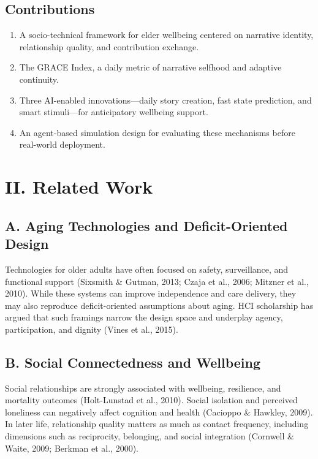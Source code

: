 \documentclass[
  journal,
]{IEEEtran}%
\providecommand{\tightlist}{%
  \setlength{\itemsep}{0pt}\setlength{\parskip}{0pt}}
\begin{document}
\subsection{Contributions}\label{contributions}

\begin{enumerate}
\def\labelenumi{\arabic{enumi}.}
\tightlist
\item
  A socio-technical framework for elder wellbeing centered on narrative
  identity, relationship quality, and contribution exchange.
\item
  The GRACE Index, a daily metric of narrative selfhood and adaptive
  continuity.
\item
  Three AI-enabled innovations---daily story creation, fast state
  prediction, and smart stimuli---for anticipatory wellbeing support.
\item
  An agent-based simulation design for evaluating these mechanisms
  before real-world deployment.
\end{enumerate}

\section{II. Related Work}\label{ii.-related-work}

\subsection{A. Aging Technologies and Deficit-Oriented
Design}\label{a.-aging-technologies-and-deficit-oriented-design}

Technologies for older adults have often focused on safety,
surveillance, and functional support (Sixsmith \& Gutman, 2013; Czaja et
al., 2006; Mitzner et al., 2010). While these systems can improve
independence and care delivery, they may also reproduce deficit-oriented
assumptions about aging. HCI scholarship has argued that such framings
narrow the design space and underplay agency, participation, and dignity
(Vines et al., 2015).

\subsection{B. Social Connectedness and
Wellbeing}\label{b.-social-connectedness-and-wellbeing}

Social relationships are strongly associated with wellbeing, resilience,
and mortality outcomes (Holt-Lunstad et al., 2010). Social isolation and
perceived loneliness can negatively affect cognition and health
(Cacioppo \& Hawkley, 2009). In later life, relationship quality matters
as much as contact frequency, including dimensions such as reciprocity,
belonging, and social integration (Cornwell \& Waite, 2009; Berkman et
al., 2000).
\end{document}
